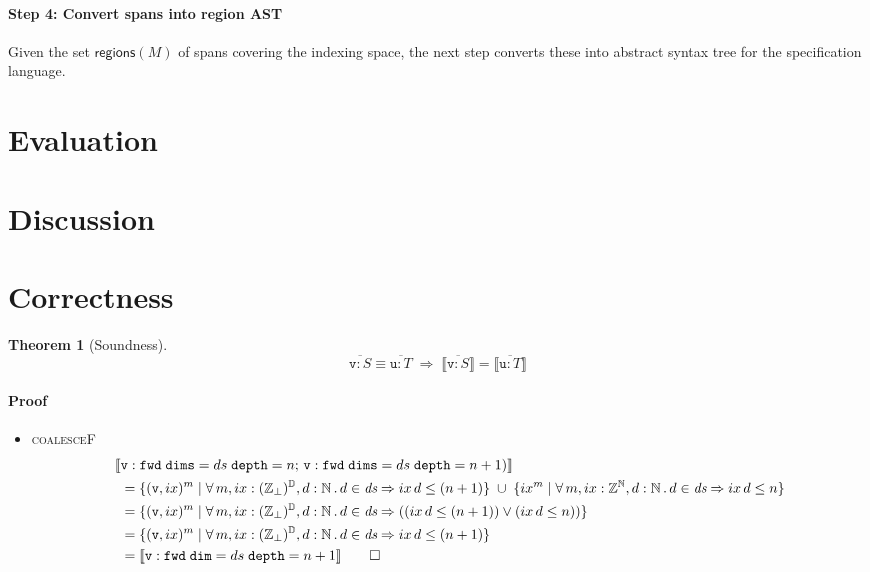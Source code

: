 \documentclass[9pt]{sigplanconf}
\newcounter{block}
\theoremstyle{definition}
\newtheorem{theorem}[block]{Theorem}
\newcommand{\interp}[1]{\llbracket{#1}\rrbracket}
\begin{document}
\paragraph{Step 4: Convert spans into region AST}

Given the set $\textsf{regions}(M)$ of spans covering the indexing
space, the next step converts these into abstract syntax tree
for the specification language.


\section{Evaluation}
\label{sec:evaluation}

\section{Discussion}
\label{sec:discussion}





\onecolumn
\appendix

\section{Correctness}


\begin{theorem}[Soundness]
\[
\overline{\texttt{v} : S}\equiv \overline{\texttt{u} : T}
\; \Rightarrow \;
\interp{\overline{\texttt{v} : S}} = \interp{\overline{\texttt{u} : T}}
\]
\end{theorem}

\paragraph{Proof}
\begin{itemize}
\item \textsc{coalesceF}
\begin{align*}
\llbracket & \texttt{v} : \texttt{fwd} \; \texttt{dims}=ds \; \texttt{depth}=n; \,
  \texttt{v} :  \texttt{fwd} \; \texttt{dims}=ds \;
  \texttt{depth}=n+1)\rrbracket \\
& =  \{ (\texttt{v}, ix)^m \mid \forall \, m, ix : \relix, d : \mathbb{N}
  \, . \, d \in \textit{ds} \Rightarrow ix \, d \leq (n+1) \} \; \cup \; \{ ix^m \mid \forall \, m, ix : \mathbb{Z}^{\mathbb{N}}, d : \mathbb{N}
  \, . \, d \in \textit{ds} \Rightarrow ix \, d \leq n \}\\
& =  \{ (\texttt{v}, ix)^m \mid \forall \, m, ix : \relix, d : \mathbb{N}
  \, . \, d \in \textit{ds} \Rightarrow ((ix \, d \leq (n+1)) \vee (ix \,
  d \leq n)) \} \\
& =  \{ (\texttt{v}, ix)^m \mid \forall \, m, ix : \relix, d : \mathbb{N}
  \, . \, d \in \textit{ds} \Rightarrow ix \, d \leq (n+1) \} \\
& = \interp{\texttt{v} : \texttt{fwd} \; \texttt{dim}=ds \;
  \texttt{depth}=n + 1} \qquad \Box
\end{align*}
\end{itemize}
\end{document}
